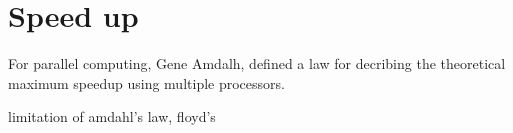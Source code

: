 \section{Speed up}
\label{sup}
  For parallel computing, Gene Amdalh, defined a law for decribing the theoretical maximum speedup using multiple processors.

  limitation of amdahl's law, floyd's
